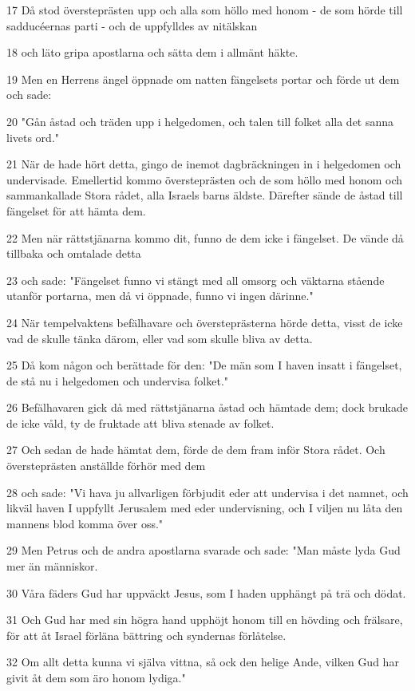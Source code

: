 \par 17 Då stod översteprästen upp och alla som höllo med honom - de som hörde till sadducéernas parti - och de uppfylldes av nitälskan
\par 18 och läto gripa apostlarna och sätta dem i allmänt häkte.
\par 19 Men en Herrens ängel öppnade om natten fängelsets portar och förde ut dem och sade:
\par 20 "Gån åstad och träden upp i helgedomen, och talen till folket alla det sanna livets ord."
\par 21 När de hade hört detta, gingo de inemot dagbräckningen in i helgedomen och undervisade. Emellertid kommo översteprästen och de som höllo med honom och sammankallade Stora rådet, alla Israels barns äldste. Därefter sände de åstad till fängelset för att hämta dem.
\par 22 Men när rättstjänarna kommo dit, funno de dem icke i fängelset. De vände då tillbaka och omtalade detta
\par 23 och sade: "Fängelset funno vi stängt med all omsorg och väktarna stående utanför portarna, men då vi öppnade, funno vi ingen därinne."
\par 24 När tempelvaktens befälhavare och översteprästerna hörde detta, visst de icke vad de skulle tänka därom, eller vad som skulle bliva av detta.
\par 25 Då kom någon och berättade för den: "De män som I haven insatt i fängelset, de stå nu i helgedomen och undervisa folket."
\par 26 Befälhavaren gick då med rättstjänarna åstad och hämtade dem; dock brukade de icke våld, ty de fruktade att bliva stenade av folket.
\par 27 Och sedan de hade hämtat dem, förde de dem fram inför Stora rådet. Och översteprästen anställde förhör med dem
\par 28 och sade: "Vi hava ju allvarligen förbjudit eder att undervisa i det namnet, och likväl haven I uppfyllt Jerusalem med eder undervisning, och I viljen nu låta den mannens blod komma över oss."
\par 29 Men Petrus och de andra apostlarna svarade och sade: "Man måste lyda Gud mer än människor.
\par 30 Våra fäders Gud har uppväckt Jesus, som I haden upphängt på trä och dödat.
\par 31 Och Gud har med sin högra hand upphöjt honom till en hövding och frälsare, för att åt Israel förläna bättring och syndernas förlåtelse.
\par 32 Om allt detta kunna vi själva vittna, så ock den helige Ande, vilken Gud har givit åt dem som äro honom lydiga."
